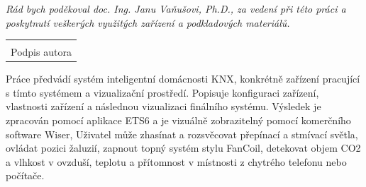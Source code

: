 \documentclass[12pt, a4paper,
twoside,        %
openright
]{report}
\newcommand\datumOdevzdani{1. 1. 2024} %
\begin{document}
\cleardoublepage %
	

	
	\noindent \textit {Rád bych poděkoval doc. Ing. Janu Vaňušovi, Ph.D., za vedení při této práci a poskytnutí veškerých využitých zařízení a podkladových materiálů.}
	
	\vspace*{0.7\textheight} %

	\vfill
	\noindent{V Opavě \datumOdevzdani\\}
	\noindent
	\begin{minipage}{\linewidth}
		\hspace{9.5cm} 
		\begin{tabular}{@{}p{6cm}@{}}
			\dotfill \\
			Podpis autora
		\end{tabular}
	\end{minipage}
	
	\cleardoublepage 
	\noindent Práce předvádí systém inteligentní domácnosti KNX, konkrétně zařízení pracující s tímto systémem a vizualizační prostředí. Popisuje konfiguraci zařízení, vlastnosti zařízení a následnou vizualizaci finálního systému. Výsledek je zpracován pomocí aplikace ETS6 a je vizuálně zobrazitelný pomocí komerčního software Wiser, Uživatel může zhasínat a rozsvěcovat přepínací a stmívací světla, ovládat pozici žaluzií, zapnout topný systém stylu FanCoil, detekovat objem CO2 a vlhkost v ovzduší, teplotu a přítomnost v místnosti z chytrého telefonu nebo počítače. 	
	
	\vspace{18pt}
	
\end{document}
